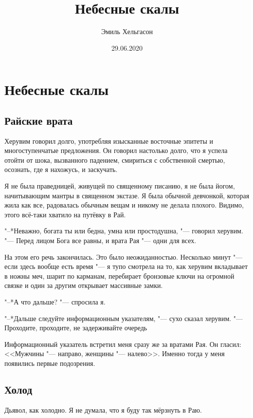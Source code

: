 \author{Эмиль Хельгасон}
\title{Небесные скалы}
\date{29.06.2020}
\maketitle

\tableofcontents

\chapter{Небесные скалы}

\section{Райские врата}

Херувим говорил долго, употребляя изысканные восточные эпитеты и многоступенчатые предложения.
Он говорил настолько долго, что я успела отойти от шока, вызванного падением, смириться с собственной смертью, осознать, где я нахожусь, и заскучать.

Я не была праведницей, живущей по священному писанию, я не была йогом, начитывающим мантры в священном экстазе.
Я была обычной девчонкой, которая жила как все, радовалась обычным вещам и никому не делала плохого.
Видимо, этого всё-таки хватило на путёвку в Рай.

"--*Неважно, богата ты или бедна, умна или простодушна, "--- говорил херувим.
"--- Перед лицом Бога все равны, и врата Рая "--- одни для всех.

На этом его речь закончилась.
Это было неожиданностью.
Несколько минут "--- если здесь вообще есть время "--- я тупо смотрела на то, как херувим вкладывает в ножны меч, шарит по карманам, перебирает бронзовые ключи на огромной связке и один за другим открывает массивные замки.

"--*А что дальше? "--- спросила я.

"--*Дальше следуйте информационным указателям, "--- сухо сказал херувим.
"--- Проходите, проходите, не задерживайте очередь\ldotst

Информационный указатель встретил меня сразу же за вратами Рая.
Он гласил: <<Мужчины "--- направо, женщины "--- налево>>.
Именно тогда у меня появились первые подозрения.

\section{Холод}

Дьявол, как холодно.
Я не думала, что я буду так мёрзнуть в Раю.


